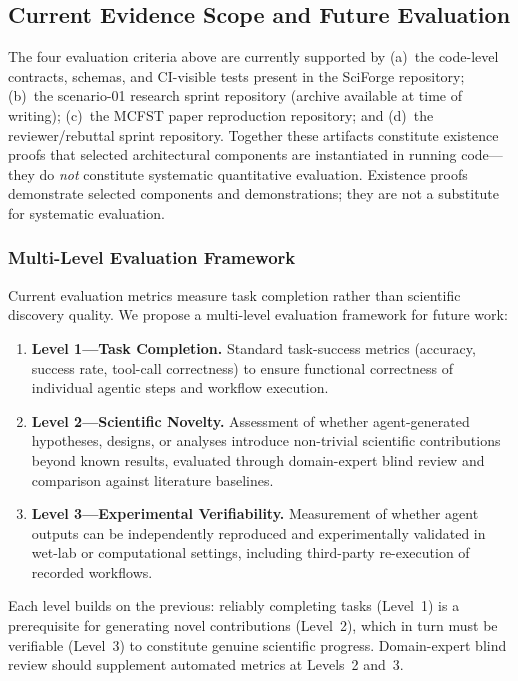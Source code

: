 \documentclass[sn-basic,Numbered,pdflatex]{sn-jnl}
\begin{document}
\subsection{Current Evidence Scope and Future Evaluation}

The four evaluation criteria above are currently supported by (a)~the code-level contracts, schemas, and CI-visible tests present in the SciForge repository; (b)~the scenario-01 research sprint repository (archive available at time of writing); (c)~the MCFST paper reproduction repository; and (d)~the reviewer/rebuttal sprint repository. Together these artifacts constitute existence proofs that selected architectural components are instantiated in running code---they do \emph{not} constitute systematic quantitative evaluation. Existence proofs demonstrate selected components and demonstrations; they are not a substitute for systematic evaluation.

\subsubsection{Multi-Level Evaluation Framework}

Current evaluation metrics measure task completion rather than scientific discovery quality. We propose a multi-level evaluation framework for future work:
\begin{enumerate}
    \item \textbf{Level 1---Task Completion.} Standard task-success metrics (accuracy, success rate, tool-call correctness) to ensure functional correctness of individual agentic steps and workflow execution.
    \item \textbf{Level 2---Scientific Novelty.} Assessment of whether agent-generated hypotheses, designs, or analyses introduce non-trivial scientific contributions beyond known results, evaluated through domain-expert blind review and comparison against literature baselines.
    \item \textbf{Level 3---Experimental Verifiability.} Measurement of whether agent outputs can be independently reproduced and experimentally validated in wet-lab or computational settings, including third-party re-execution of recorded workflows.
\end{enumerate}
Each level builds on the previous: reliably completing tasks (Level~1) is a prerequisite for generating novel contributions (Level~2), which in turn must be verifiable (Level~3) to constitute genuine scientific progress. Domain-expert blind review should supplement automated metrics at Levels~2 and~3.
\end{document}
